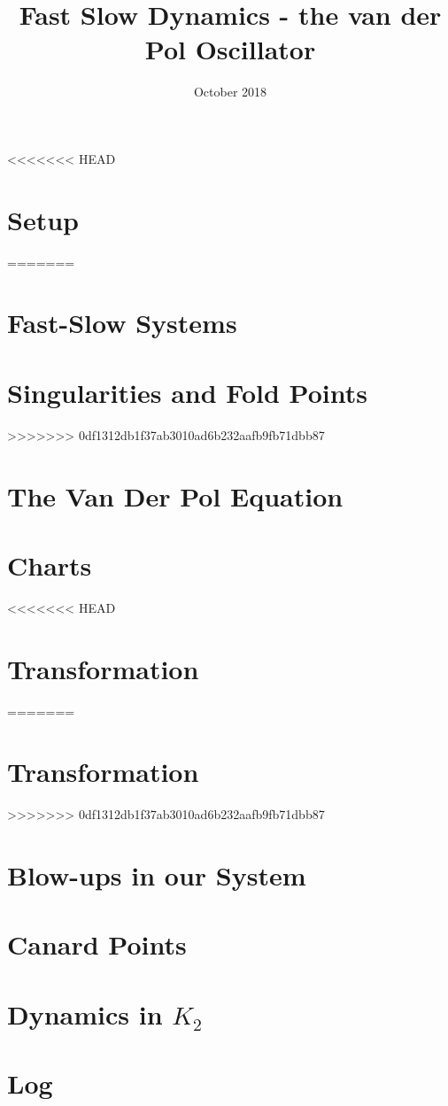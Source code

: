 \documentclass{article}
\title{Fast Slow Dynamics - the van der Pol Oscillator}
\author{}
\date{October 2018}
\begin{document}
\maketitle

<<<<<<< HEAD
\section{Setup}

=======
\section{Fast-Slow Systems} \label{Intro}


\section{Singularities and Fold Points}

>>>>>>> 0df1312db1f37ab3010ad6b232aafb9fb71dbb87

\section{The Van Der Pol Equation}


\section{Charts}\label{sec: charts}
<<<<<<< HEAD


\section{Transformation}

=======


\section{Transformation}

>>>>>>> 0df1312db1f37ab3010ad6b232aafb9fb71dbb87

\section{Blow-ups in our System}\label{sec: VDP Blowup}


\section{Canard Points}

\newpage
\appendix
\section{Dynamics in \texorpdfstring{$K_2$}{K2}}

\newpage


\nocite{strogatz2007nonlinear}
\appendix
\section{Log}
\end{document}
